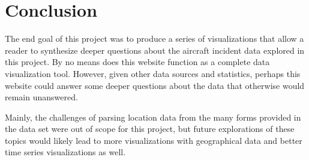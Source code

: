 \documentclass{article}
\begin{document}
  \section{Conclusion}
    The end goal of this project was to produce a series of visualizations that allow a reader to synthesize deeper questions about the aircraft incident data explored in this project. By no means does this website function as a complete data visualization tool. However, given other data sources and statistics, perhaps this website could answer some deeper questions about the data that otherwise would remain unanswered.

    Mainly, the challenges of parsing location data from the many forms provided in the data set were out of scope for this project, but future explorations of these topics would likely lead to more visualizations with geographical data and better time series visualizations as well.
\end{document}

